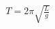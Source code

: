 \documentclass[preview]{standalone}
\begin{document}
\begin{align*}
T = 2\pi \sqrt{\frac{L}{g}}
\end{align*}
\end{document}
